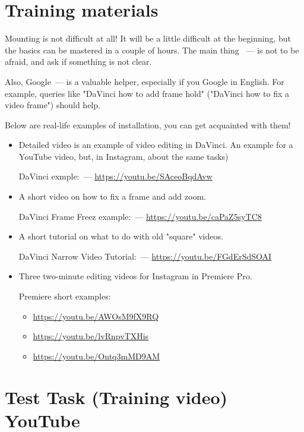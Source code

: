 \documentclass[
a4paper, %
12pt, %
article,
onecolumn, %
openany, %
]{memoir}
\begin{document}
\newpage
\section{Training materials}

Mounting is not difficult at all! It will be a little difficult at the beginning, but the basics can
be mastered in a couple of hours. The main thing ~--- is not to be afraid, and ask if something is not clear.

Also, Google~--- is a valuable helper, especially if you Google in English.
For example, queries like
"DaVinci how to add frame hold" ("DaVinci how to fix a video frame")
should help.

Below are real-life examples of installation, you can get acquainted with them!
\begin{itemize}
\item Detailed video is an example of video editing in DaVinci.
An example for a YouTube video, but, in
Instagram, about the same tasks)

DaVinci exmple:~--- \href{https://youtu.be/SAceoBqdAvw}{https://youtu.be/SAceoBqdAvw}
\item A short video on how to fix a frame and add zoom.

DaVinci Frame Freez example:~--- \href{https://youtu.be/caPaZ5syTC8}{https://youtu.be/caPaZ5syTC8}
\item A short tutorial on what to do with old "square" videos.

DaVinci Narrow Video Tutorial:~--- \href{https://youtu.be/FGdErSdSOAI}{https://youtu.be/FGdErSdSOAI}

\item Three two-minute editing videos for Instagram in Premiere Pro.

Premiere short examples:
\begin{itemize}
\item \href{https://youtu.be/AWOsM9fX9RQ}{https://youtu.be/AWOsM9fX9RQ}
\item \href{https://youtu.be/lvRnpvTXHis}{https://youtu.be/lvRnpvTXHis}
\item \href{https://youtu.be/Ontq3mMD9AM}{https://youtu.be/Ontq3mMD9AM}
\end{itemize}
\end{itemize}




\newpage
\section{Test Task (Training video) YouTube}
\end{document}
